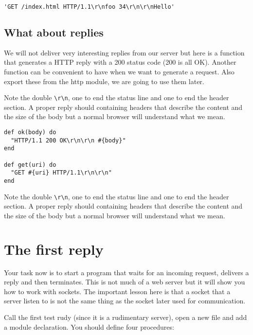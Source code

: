 \documentclass[a4paper,11pt]{article}
\begin{document}
\begin{verbatim}
'GET /index.html HTTP/1.1\r\nfoo 34\r\n\r\nHello'
\end{verbatim}

\subsection{What about replies}
We will not deliver very interesting replies from our server but here
is a function that generates a HTTP reply with a 200 status code (200
is all OK). Another function can be convenient to have when we want to
generate a request. Also export these from the http module, we are
going to use them later.

Note the double {\tt \textbackslash r\textbackslash n}, one to end the
status line and one to end the header section. A proper reply should
containing headers that describe the content and the size of the body
but a normal browser will understand what we mean.

\pagebreak

\begin{verbatim}
def ok(body) do
  "HTTP/1.1 200 OK\r\n\r\n #{body}"
end

def get(uri) do
  "GET #{uri} HTTP/1.1\r\n\r\n"
end
\end{verbatim}

Note the double {\tt \textbackslash r\textbackslash n}, one to end the
status line and one to end the header section. A proper reply should
containing headers that describe the content and the size of the body
but a normal browser will understand what we mean.



\section{The first reply}

Your task now is to start a program that waits for an incoming
request, delivers a reply and then terminates. This is not much of a
web server but it will show you how to work with sockets. The
important lesson here is that a socket that a server listen to is not
the same thing as the socket later used for communication. 

Call the first test rudy (since it is a rudimentary server), open a
new file and add a module declaration. You should define four
procedures:
\end{document}
